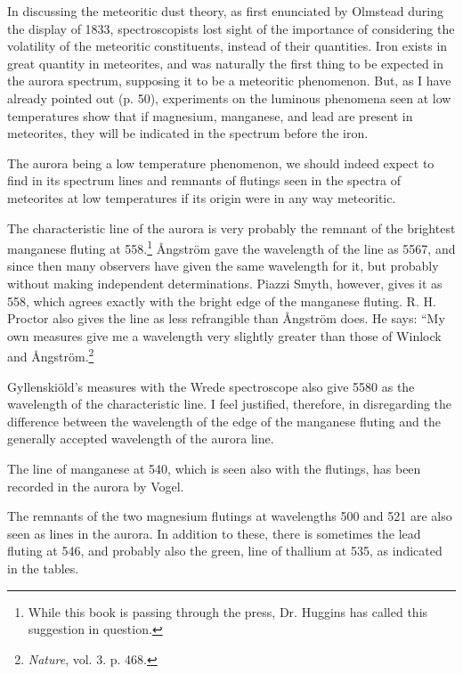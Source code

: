 \documentclass[a4paper, 12pt, oneside, polutonikogreek, english]{article}
\begin{document}
In discussing the meteoritic dust theory, as first enunciated by Olmstead during the display of 1833, spectroscopists lost sight of the importance of considering the volatility of the meteoritic constituents, instead of their quantities. Iron exists in great quantity in meteorites, and was naturally the first thing to be expected in the aurora spectrum, supposing it to be a meteoritic phenomenon. But, as I have already pointed out (p. 50), experiments on the luminous phenomena seen at low temperatures show that if magnesium, manganese, and lead are present in meteorites, they will be indicated in the spectrum before the iron.

The aurora being a low temperature phenomenon, we should indeed expect to find in its spectrum lines and remnants of flutings seen in the spectra of meteorites at low temperatures if its origin were in any way meteoritic.

The characteristic line of the aurora is very probably the remnant of the brightest manganese fluting at 558.\footnote{While this book is passing through the press, Dr. Huggins has called this suggestion in question.} Ångström gave the wavelength of the line as 5567, and since then many observers have given the same wavelength for it, but probably without making independent determinations. Piazzi Smyth, however, gives it as 558, which agrees exactly with the bright edge of the manganese fluting. R. H. Proctor also gives the line as less refrangible than Ångström does. He says: ``My own measures give me a wavelength very slightly greater than those of Winlock and Ångström.\footnote{\emph{Nature}, vol. 3. p. 468.}

Gyllenskiöld's measures with the Wrede spectroscope also give 5580 as the wavelength of the characteristic line. I feel justified, therefore, in disregarding the difference between the wavelength of the edge of the manganese fluting and the generally accepted wavelength of the aurora line.

The line of manganese at 540, which is seen also with the flutings, has been recorded in the aurora by Vogel.

The remnants of the two magnesium flutings at wavelengths 500 and 521 are also seen as lines in the aurora. In addition to these, there is sometimes the lead fluting at 546, and probably also the green, line of thallium at 535, as indicated in the tables.
\end{document}
